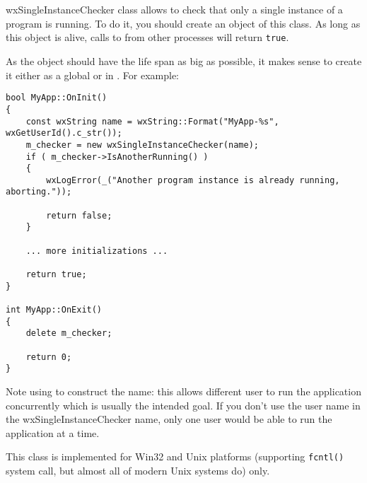
\section{}\label{wxsingleinstancechecker}

wxSingleInstanceChecker class allows to check that only a single instance of a
program is running. To do it, you should create an object of this class. As
long as this object is alive, calls to 
 from
other processes will return {\tt true}.

As the object should have the life span as big as possible, it makes sense to
create it either as a global or in . For
example:

\begin{verbatim}
bool MyApp::OnInit()
{
    const wxString name = wxString::Format("MyApp-%s", wxGetUserId().c_str());
    m_checker = new wxSingleInstanceChecker(name);
    if ( m_checker->IsAnotherRunning() )
    {
        wxLogError(_("Another program instance is already running, aborting."));

        return false;
    }

    ... more initializations ...

    return true;
}

int MyApp::OnExit()
{
    delete m_checker;

    return 0;
}
\end{verbatim}

Note using  to construct the name: this
allows different user to run the application concurrently which is usually the
intended goal. If you don't use the user name in the wxSingleInstanceChecker
name, only one user would be able to run the application at a time.

This class is implemented for Win32 and Unix platforms (supporting {\tt fcntl()}
system call, but almost all of modern Unix systems do) only.


